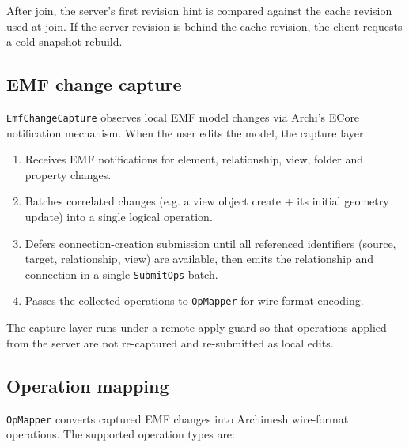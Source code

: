 After join, the server's first revision hint is compared against the cache
revision used at join. If the server revision is behind the cache revision,
the client requests a cold snapshot rebuild.

\subsection{EMF change capture}

\texttt{EmfChangeCapture} observes local EMF model changes via Archi's
ECore notification mechanism. When the user edits the model, the capture
layer:

\begin{enumerate}
\item Receives EMF notifications for element, relationship, view, folder
  and property changes.
\item Batches correlated changes (e.g. a view object create + its initial
  geometry update) into a single logical operation.
\item Defers connection-creation submission until all referenced identifiers
  (source, target, relationship, view) are available, then emits the
  relationship and connection in a single \texttt{SubmitOps} batch.
\item Passes the collected operations to \texttt{OpMapper} for wire-format
  encoding.
\end{enumerate}

The capture layer runs under a remote-apply guard so that operations applied
from the server are not re-captured and re-submitted as local edits.

\subsection{Operation mapping}

\texttt{OpMapper} converts captured EMF changes into Archimesh wire-format
operations. The supported operation types are:

